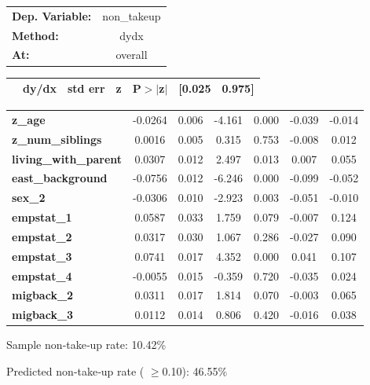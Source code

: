 \begin{center}
\begin{tabular}{lc}
\toprule
\textbf{Dep. Variable:}       &  non\_takeup    \\
\textbf{Method:}              &      dydx       \\
\textbf{At:}                  &    overall      \\
\bottomrule
\end{tabular}
\begin{tabular}{ccccccc}
          \textbf{}           & \textbf{dy/dx} & \textbf{std err} & \textbf{z} & \textbf{P$> |$z$|$} & \textbf{[0.025} & \textbf{0.975]}  \\
\midrule
\bottomrule
\end{tabular}
\begin{tabular}{lcccccc}
\textbf{z\_age}               &      -0.0264   &        0.006     &    -4.161  &         0.000        &       -0.039    &       -0.014     \\
\textbf{z\_num\_siblings}     &       0.0016   &        0.005     &     0.315  &         0.753        &       -0.008    &        0.012     \\
\textbf{living\_with\_parent} &       0.0307   &        0.012     &     2.497  &         0.013        &        0.007    &        0.055     \\
\textbf{east\_background}     &      -0.0756   &        0.012     &    -6.246  &         0.000        &       -0.099    &       -0.052     \\
\textbf{sex\_2}               &      -0.0306   &        0.010     &    -2.923  &         0.003        &       -0.051    &       -0.010     \\
\textbf{empstat\_1}           &       0.0587   &        0.033     &     1.759  &         0.079        &       -0.007    &        0.124     \\
\textbf{empstat\_2}           &       0.0317   &        0.030     &     1.067  &         0.286        &       -0.027    &        0.090     \\
\textbf{empstat\_3}           &       0.0741   &        0.017     &     4.352  &         0.000        &        0.041    &        0.107     \\
\textbf{empstat\_4}           &      -0.0055   &        0.015     &    -0.359  &         0.720        &       -0.035    &        0.024     \\
\textbf{migback\_2}           &       0.0311   &        0.017     &     1.814  &         0.070        &       -0.003    &        0.065     \\
\textbf{migback\_3}           &       0.0112   &        0.014     &     0.806  &         0.420        &       -0.016    &        0.038     \\
\bottomrule
\end{tabular}
\end{center}

Sample non‑take‑up rate:          10.42\%

Predicted non‑take‑up rate ( \( \geq  \)0.10): 46.55\%
